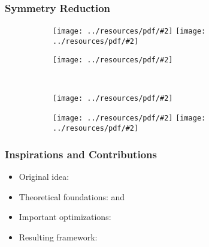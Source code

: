 \documentclass{beamer}
\newcommand{\includeressource}[2][]{\texttt{[image: ../resources/pdf/\#2]}}
\begin{document}
\begin{frame}
  \frametitle{Symmetry Reduction}

  \begin{figure}
    \centering
    \begin{subfigure}{.3\textwidth}
      \begin{overprint}
        \includeressource[width=\textwidth]{%
          regular_mesh_4_4_mapping1_noarrow.pdf}
        \includeressource[width=\textwidth]{%
          regular_mesh_4_4_mapping1.pdf}
      \end{overprint}
    \end{subfigure}
    \hspace*{.5cm}
    \begin{subfigure}{.3\textwidth}
      \includeressource[width=\textwidth]{regular_mesh_4_4_mapping2.pdf}
    \end{subfigure} \\
    \vspace*{.5cm}
    \begin{subfigure}{.3\textwidth}
      \includeressource[width=\textwidth]{regular_mesh_4_4_mapping4.pdf}
    \end{subfigure}
    \hspace*{.5cm}
    \begin{subfigure}{.3\textwidth}
      \begin{overprint}
        \includeressource[width=\textwidth]{%
          regular_mesh_4_4_mapping5_noarrow.pdf}
        \includeressource[width=\textwidth]{%
          regular_mesh_4_4_mapping5.pdf}
      \end{overprint}
    \end{subfigure}
  \end{figure}
\end{frame}

\begin{frame}
  \frametitle{Inspirations and Contributions}

  \begin{itemize}
    \setlength\itemsep{.25cm}

    \item<1-> Original idea: \cite{Goens}
    \item<2-> Theoretical foundations: \cite{Holt} and \cite{Mitchell}
    \item<3-> Important optimizations: \cite{Donaldson}
    \item<4-> Resulting framework: \cite{mpsym}
  \end{itemize}
\end{frame}
\end{document}
